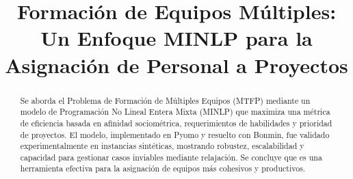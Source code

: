 \documentclass[conference]{IEEEtran}
\begin{document}
\title{Formación de Equipos Múltiples: Un Enfoque MINLP para la Asignación de Personal a Proyectos}

\author{
}

\maketitle

\begin{abstract}
    Se aborda el Problema de Formación de Múltiples Equipos (MTFP) mediante un modelo de Programación No Lineal Entera Mixta (MINLP) que maximiza una métrica de eficiencia basada en afinidad sociométrica, requerimientos de habilidades y prioridad de proyectos. El modelo, implementado en Pyomo y resuelto con Bonmin, fue validado experimentalmente en instancias sintéticas, mostrando robustez, escalabilidad y capacidad para gestionar casos inviables mediante relajación. Se concluye que es una herramienta efectiva para la asignación de equipos más cohesivos y productivos.

\end{abstract}
\end{document}
